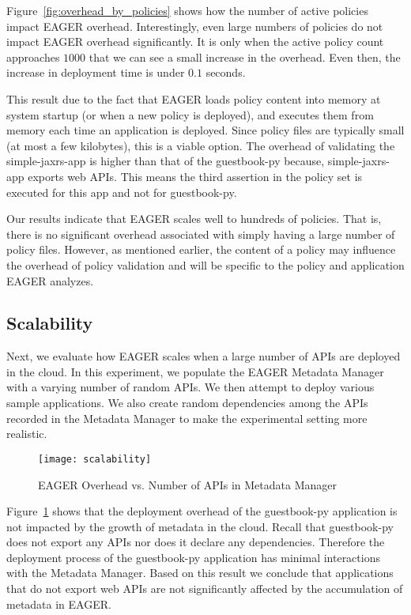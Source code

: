Figure~\ref{fig:overhead_by_policies} shows how the number of active policies
impact EAGER overhead. Interestingly, even large numbers of policies 
do not impact EAGER overhead significantly. It is only when the active
policy count approaches $1000$ that we can see a small increase in the
overhead. Even then, the increase in deployment time is under $0.1$ seconds. 

This result due to the fact that EAGER loads policy content into memory at system
startup (or when a new policy is deployed), and executes them from memory each
time an application is deployed. Since policy files are typically small (at
most a few kilobytes), this is a viable option. The overhead of validating the
simple-jaxrs-app is higher than that of the guestbook-py because,
simple-jaxrs-app exports web APIs. This means the third assertion in the
policy set is executed for this app and not for guestbook-py. 

Our results indicate that EAGER scales well to hundreds of policies. That is,
there is no significant overhead associated with simply having a large number
of policy files. However, as mentioned earlier, the content of a policy may
influence the overhead of policy validation and will be specific to the policy and 
application EAGER analyzes.
 
\subsection{Scalability}
Next, we evaluate how EAGER scales when a large number of APIs are deployed 
in the cloud. In this experiment, we populate the EAGER
Metadata Manager with a varying number of random APIs. We then attempt to deploy various sample 
applications. We also create random dependencies among the APIs recorded in the 
Metadata Manager to make the experimental setting more realistic.

\begin{figure}
\centering
\texttt{[image: scalability]}
\caption{EAGER Overhead vs. Number of APIs in Metadata Manager}
\label{fig:scalability}
\end{figure}

Figure~\ref{fig:scalability} shows that the deployment overhead of the 
guestbook-py application is not impacted by the growth of metadata
in the cloud. Recall that guestbook-py does not export any APIs nor does it 
declare any dependencies. Therefore the deployment process of
the guestbook-py application has minimal interactions with the 
Metadata Manager. Based on this result we conclude that applications that
do not export web APIs are not significantly affected by the accumulation 
of metadata in EAGER.

